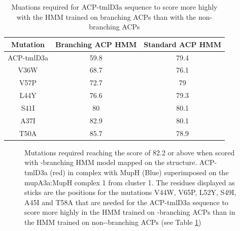 				
				\begin{table}[htbp]
				\begin{small}
				\caption{Muations required for ACP-tmlD3a sequence to score more highly with the HMM trained on branching ACPs than with the non-branching ACPs}
				\label{tab:MinimumACPChanges}
				\begin{center}
				\begin{tabular}{c c c}
					\toprule[2pt]
					 Mutation  & Branching ACP HMM & Standard ACP HMM \\ \midrule[1pt]
					ACP-tmlD3a & 59.8              & 79.4             \\
					   V36W    & 68.7              & 76.1             \\
					   V57P    & 72.7              & 79               \\
					   L44Y    & 76.6              & 79.3             \\
					   S41I    & 80                & 80.1             \\
					   A37I    & 82.9              & 80.1             \\
					   T50A    & 85.7              & 78.9             \\ \bottomrule[2pt]
				\end{tabular}
				\end{center}
				\end{small}
				\end{table}
	
			\setlength\fboxsep{5pt}
			\setlength\fboxrule{1.5pt}
			\begin{figure}[]
			\centering
			\caption[Mutations required reaching the score of 82.2 or above when scored with \bet-branching HMM model mapped on the structure.]{Mutations required reaching the score of 82.2 or above when scored with \bet-branching HMM model mapped on the structure. ACP-tmlD3a (red) in complex with MupH (Blue) superimposed on the mupA3a:MupH complex 1 from cluster 1. The residues displayed as sticks are the positions for the mutations V44W, V65P, L52Y, S49I, A45I and T58A that are needed for the ACP-tmlD3a sequence to score more highly in the HMM trained on \bet-branching ACPs than in the HMM trained on non-\bet-branching ACPs (see Table \ref{tab:MinimumACPChanges})}
			\label{fig:minchangestd3a}
			\end{figure}			
		
